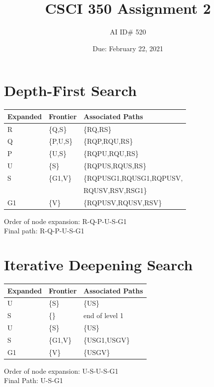 \documentclass{article}
\title{CSCI 350 Assignment 2}
\author{AI ID\# 520}
\date{Due: February 22, 2021}
\begin{document}
    \maketitle

    \section{Depth-First Search}
        \begin{center}
            \begin{tabularx}{\textwidth}{|X|X|X|}
                \hline
                Expanded & Frontier & Associated Paths\\\hline 
                R & \{Q,S\} & \{RQ,RS\} \\\hline
                Q & \{P,U,S\} & \{RQP,RQU,RS\} \\\hline
                P & \{U,S\} & \{RQPU,RQU,RS\} \\\hline
                U & \{S\} & \{RQPUS,RQUS,RS\} \\\hline
                S & \{G1,V\} & \{RQPUSG1,RQUSG1,RQPUSV,\\&&RQUSV,RSV,RSG1\}\\\hline
                G1 & \{V\} & \{RQPUSV,RQUSV,RSV\}\\\hline
            \end{tabularx}
        \end{center}
        Order of node expansion: R-Q-P-U-S-G1\\
        Final path: R-Q-P-U-S-G1\\
    \section{Iterative Deepening Search}
        \begin{center}
            \begin{tabularx}{\textwidth}{|X|X|X|}
                \hline
                Expanded & Frontier & Associated Paths\\\hline 
                U & \{S\} & \{US\}\\\hline
                S & \{\} & end of level 1\\\hline
                U & \{S\} & \{US\}\\\hline
                S & \{G1,V\} & \{USG1,USGV\}\\\hline
                G1 & \{V\} & \{USGV\}\\\hline
            \end{tabularx}
        \end{center}
        Order of node expansion: U-S-U-S-G1\\
        Final Path: U-S-G1\\
\end{document}
